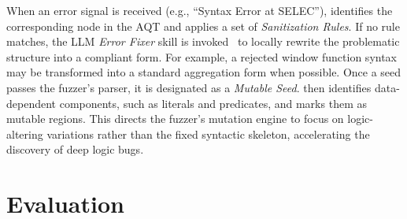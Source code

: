 \documentclass[sigconf,review,anonymous]{acmart}
\begin{document}
When an error signal is received (e.g., ``Syntax Error at SELEC''), \tool{} identifies the corresponding node in the AQT and applies a set of \textit{Sanitization Rules}. If no rule matches, the LLM \textit{Error Fixer} skill is invoked~\cite{fan2023automated} to locally rewrite the problematic structure into a compliant form. For example, a rejected window function syntax may be transformed into a standard aggregation form when possible.
Once a seed passes the fuzzer's parser, it is designated as a \textit{Mutable Seed}. \tool{} then identifies data-dependent components, such as literals and predicates, and marks them as mutable regions. This directs the fuzzer's mutation engine to focus on logic-altering variations rather than the fixed syntactic skeleton, accelerating the discovery of deep logic bugs.



\section{Evaluation}
\label{sec:evaluation}
\end{document}
